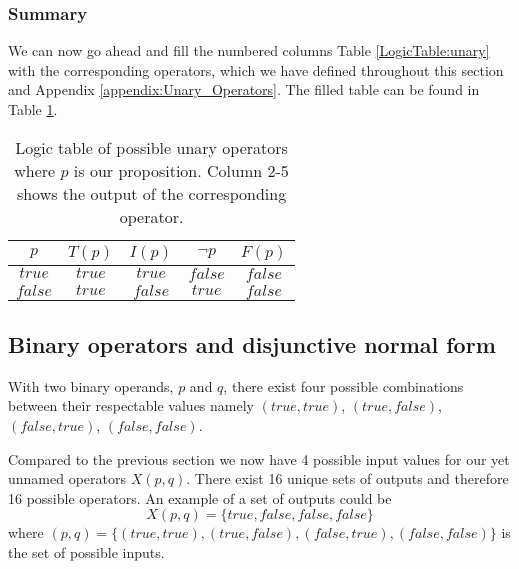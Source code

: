             \subsubsection{Summary}
                
                We can now go ahead and fill the numbered columns Table \ref{LogicTable:unary} with the corresponding operators, which we have defined throughout this section and Appendix \ref{appendix:Unary_Operators}. The filled table can be found in Table \ref{LogicTable:unaryfilled}.
                
                \begin{table}[h!]
                    \centering
                    \begin{tabular}{|c||c|c|c|c|}
                    	\hline
                    	  $p$   & $T(p)$ & $I(p)$  & $\neg p$ & $F(p)$  \\ \hline
                    	$true$  & $true$ & $true$  & $false$  & $false$ \\ \hline
                    	$false$ & $true$ & $false$ &  $true$  & $false$ \\ \hline
                    \end{tabular}
                    \caption{Logic table of possible unary operators where $p$ is our proposition. Column 2-5 shows the output of the corresponding operator.}
                    \label{LogicTable:unaryfilled}
                \end{table} 
                
                 
\newpage        
        \subsection{Binary operators and disjunctive normal form}\label{DNF}
        
            With two binary operands, $p$ and $q$, there exist four possible combinations between their respectable values namely $(true, true)$, $(true, false)$, $(false, true)$, $(false, false)$.
            
            Compared to the previous section we now have 4 possible input values for our yet unnamed operators $X(p, q)$. There exist 16 unique sets of outputs and therefore 16 possible operators. An example of a set of outputs could be 
            \begin{equation}
                X(p, q) =\{true, false, false, false\}
            \end{equation}
            where $(p, q) = \{(true, true), (true, false), (false, true), (false, false)\}$ is the set of possible inputs. 
            
